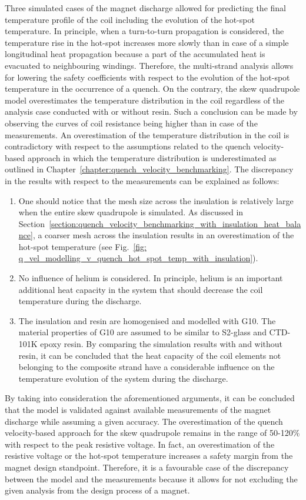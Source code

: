 
Three simulated cases of the magnet discharge allowed for predicting the final temperature profile of the coil including the evolution of the hot-spot temperature. In principle, when a turn-to-turn propagation is considered, the temperature rise in the hot-spot increases more slowly than in case of a simple longitudinal heat propagation because a part of the accumulated heat is evacuated to neighbouring windings. Therefore, the multi-strand analysis allows for lowering the safety coefficients with respect to the evolution of the hot-spot temperature in the occurrence of a quench. On the contrary, the skew quadrupole model overestimates the temperature distribution in the coil regardless of the analysis case conducted with or without resin. Such a conclusion can be made by observing the curves of coil resistance being higher than in case of the measurements. An overestimation of the temperature distribution in the coil is contradictory with respect to the assumptions related to the quench velocity-based approach in which the temperature distribution is underestimated as outlined in Chapter~\ref{chapter:quench_velocity_benchmarking}. The discrepancy in the results with respect to the measurements can be explained as follows: 

\begin{enumerate}
    \item One should notice that the mesh size across the insulation is relatively large when the entire skew quadrupole is simulated. As discussed in Section~\ref{section:quench_velocity_benchmarking_with_insulation_heat_balance}, a coarser mesh across the insulation results in an overestimation of the hot-spot temperature (see Fig.~\ref{fig: q_vel_modelling_v_quench_hot_spot_temp_with_insulation}).
    \item No influence of helium is considered. In principle, helium is an important additional heat capacity in the system that should decrease the coil temperature during the discharge.
    \item The insulation and resin are homogenised and modelled with G10. The material properties of G10 are assumed to be similar to S2-glass and CTD-101K epoxy resin. By comparing the simulation results with and without resin, it can be concluded that the heat capacity of the coil elements not belonging to the composite strand have a considerable influence on the temperature evolution of the system during the discharge.
\end{enumerate}

By taking into consideration the aforementioned arguments, it can be concluded that the model is validated against available measurements of the magnet discharge while assuming a given accuracy. The overestimation of the quench velocity-based approach for the skew quadrupole remains in the range of 50-120\% with respect to the peak resistive voltage. In fact, an overestimation of the resistive voltage or the hot-spot temperature increases a safety margin from the magnet design standpoint. Therefore, it is a favourable case of the discrepancy between the model and the measurements because it allows for not excluding the given analysis from the design process of a magnet. 
